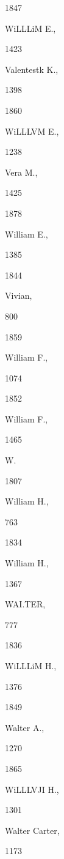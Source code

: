 \documentclass{book}
\begin{document}
{{{1847 


WiLLLiM E., 


1423 




Valentestk K., 


1398 


1860 


WiLLLVM E., 


1238 




Vera M., 


1425 


1878 


William E., 


1385 


1844 


Vivian, 


800 


1859 


William F., 


1074 








1852 


William F., 


1465 




W. 




1807 


William H., 


763 








1834 


William H., 


1367 




WAI.TER, 


777 


1836 


WiLLLiM H., 


1376 


1849 


Walter A., 


1270 


1865 


WiLLLVJI H., 


1301 




Walter Carter, 


1173 


}}}
\end{document}
